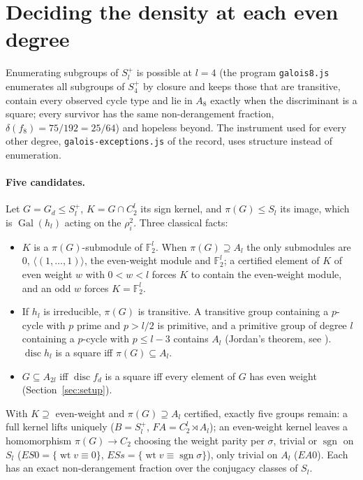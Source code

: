 \documentclass[11pt]{article}
\DeclareMathOperator{\disc}{disc}
\DeclareMathOperator{\Gal}{Gal}
\DeclareMathOperator{\wt}{wt}
\newcommand{\Sl}{S_l^{+}}
\begin{document}
\section{Deciding the density at each even degree}\label{sec:squeeze}

Enumerating subgroups of $\Sl$ is possible at $l=4$ (the program \texttt{galois8.js} enumerates all subgroups of $S_4^+$ by closure and keeps those that are transitive, contain every observed cycle type and lie in $A_8$ exactly when the discriminant is a square; every survivor has the same non-derangement fraction, $\delta(f_8)=75/192=25/64$) and hopeless beyond. The instrument used for every other degree, \texttt{galois-exceptions.js} of the record, uses structure instead of enumeration.

\paragraph{Five candidates.} Let $G=G_d\le\Sl$, $K=G\cap C_2^l$ its sign kernel, and $\pi(G)\le S_l$ its image, which is $\Gal(h_l)$ acting on the $\rho_i^2$. Three classical facts:
\begin{itemize}
\item[(K)] $K$ is a $\pi(G)$-submodule of $\mathbb F_2^l$. When $\pi(G)\supseteq A_l$ the only submodules are $0$, $\langle(1,\dots,1)\rangle$, the even-weight module and $\mathbb F_2^l$; a certified element of $K$ of even weight $w$ with $0<w<l$ forces $K$ to contain the even-weight module, and an odd $w$ forces $K=\mathbb F_2^l$.
\item[($\pi$)] If $h_l$ is irreducible, $\pi(G)$ is transitive. A transitive group containing a $p$-cycle with $p$ prime and $p>l/2$ is primitive, and a primitive group of degree $l$ containing a $p$-cycle with $p\le l-3$ contains $A_l$ (Jordan's theorem, see \cite{Wielandt}). $\disc h_l$ is a square iff $\pi(G)\subseteq A_l$.
\item[($\pm$)] $G\subseteq A_{2l}$ iff $\disc f_d$ is a square iff every element of $G$ has even weight (Section~\ref{sec:setup}).
\end{itemize}
With $K\supseteq$ even-weight and $\pi(G)\supseteq A_l$ certified, exactly five groups remain: a full kernel lifts uniquely ($B=\Sl$, $FA=C_2^l\rtimes A_l$); an even-weight kernel leaves a homomorphism $\pi(G)\to C_2$ choosing the weight parity per $\sigma$, trivial or $\operatorname{sgn}$ on $S_l$ ($ES0=\{\wt v\equiv0\}$, $ESs=\{\wt v\equiv\operatorname{sgn}\sigma\}$), only trivial on $A_l$ ($EA0$). Each has an exact non-derangement fraction over the conjugacy classes of $S_l$.
\end{document}
